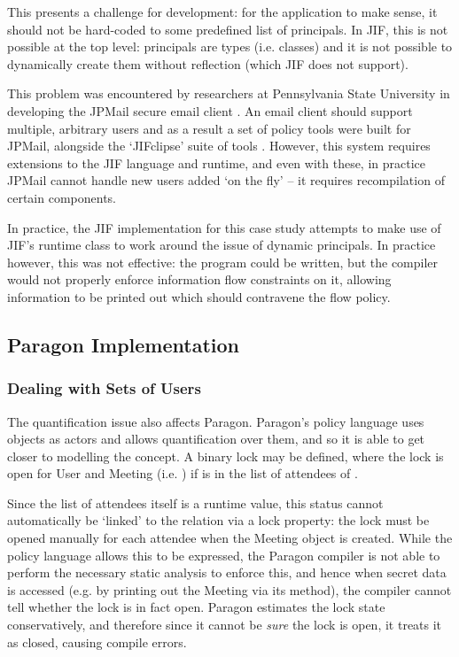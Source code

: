 This presents a challenge for development: for the application to make sense, it should not be hard-coded to some predefined list of principals. In JIF, this is not possible at the top level: principals are types (i.e. classes) and it is not possible to dynamically create them without reflection (which JIF does not support).

This problem was encountered by researchers at Pennsylvania State University in developing the JPMail secure email client \cite{jpmailpage}. An email client should support multiple, arbitrary users and as a result a set of policy tools were built for JPMail, alongside the `JIFclipse' suite of tools \cite{hicks2007jifclipse}. However, this system requires extensions to the JIF language and runtime, and even with these, in practice JPMail cannot handle new users added `on the fly' -- it requires recompilation of certain components.

In practice, the JIF implementation for this case study attempts to make use of JIF's runtime  class to work around the issue of dynamic principals. In practice however, this was not effective: the program could be written, but the compiler would not properly enforce information flow constraints on it, allowing information to be printed out which should contravene the flow policy.

\subsection{Paragon Implementation}

\subsubsection{Dealing with Sets of Users}

The quantification issue also affects Paragon. Paragon's policy language uses objects as actors and allows quantification over them, and so it is able to get closer to modelling the concept. A binary lock  may be defined, where the lock is open for User  and Meeting  (i.e. ) if  is in the list of attendees of .

Since the list of attendees itself is a runtime value, this status cannot automatically be `linked' to the relation via a lock property: the lock must be opened manually for each attendee when the Meeting object is created. While the policy language allows this to be expressed, the Paragon compiler is not able to perform the necessary static analysis to enforce this, and hence when secret data is accessed (e.g. by printing out the Meeting via its  method), the compiler cannot tell whether the lock is in fact open. Paragon estimates the lock state conservatively, and therefore since it cannot be \textit{sure} the lock is open, it treats it as closed, causing compile errors.

